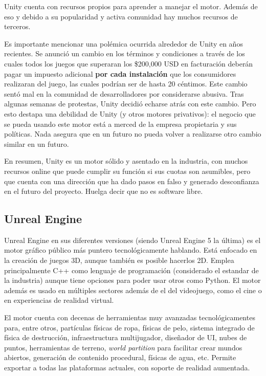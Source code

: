 Unity cuenta con recursos propios para aprender a manejar el motor. Además de eso y debido a su popularidad y activa comunidad hay muchos recursos de terceros.

Es importante mencionar una polémica\cite{unicty-scandal} ocurrida alrededor de Unity en años recientes. Se anunció un cambio en los términos y condiciones a través de los cuales todos los juegos que superaran los \$200,000 USD en facturación deberán pagar un impuesto adicional \textbf{por cada instalación} que los consumidores realizaran del juego, las cuales podrían ser de hasta 20 céntimos. Este cambio sentó mal en la comunidad de desarrolladores por considerarse abusiva. Tras algunas semanas de protestas, Unity decidió echarse atrás con este cambio. Pero esto destapa una debilidad de Unity (y otros motores privativos): el negocio que se pueda usando este motor está a merced de la empresa propietaria y sus políticas. Nada asegura que en un futuro no pueda volver a realizarse otro cambio similar en un futuro.

En resumen, Unity es un motor sólido y asentado en la industria, con muchos recursos online que puede cumplir su función si sus cuotas son asumibles, pero que cuenta con una dirección que ha dado pasos en falso y generado desconfianza en el futuro del proyecto. Huelga decir que no es software libre.

\subsection{Unreal Engine}

Unreal Engine en sus diferentes versiones (siendo Unreal Engine 5 la última) es el motor gráfico público más puntero tecnológicamente hablando. Está enfocado en la creación de juegos 3D, aunque también es posible hacerlos 2D. Emplea principalmente C++ como lenguaje de programación (considerado el estandar de la industria) aunque tiene opciones para poder usar otros como Python. El motor además es usado en múltiples sectores además de el del videojuego, como el cine o en experiencias de realidad virtual.

El motor cuenta con decenas de herramientas muy avanzadas tecnológicamentes para, entre otros, partículas físicas de ropa, físicas de pelo, sistema integrado de física de destrucción, infraestructura multijugador, diseñador de UI, nubes de puntos, herramientas de terreno, \textit{world partition} para facilitar crear mundos abiertos, generación de contenido procedural, físicas de agua, etc. Permite exportar a todas las plataformas actuales, con soporte de realidad aumentada.

